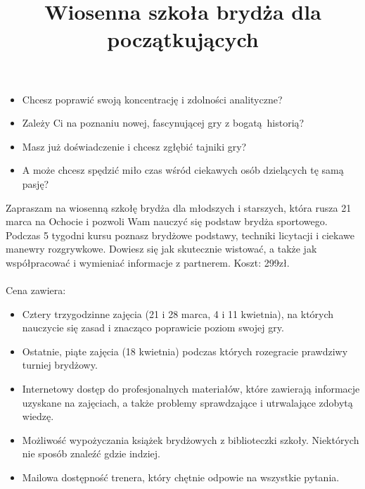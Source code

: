 \documentclass{article}
\title{Wiosenna szkoła brydża dla początkujących}
\date{}
\author{}
\begin{document}
\maketitle
\vspace{-50px}
\begin{itemize}
	\item Chcesz poprawić swoją koncentrację i zdolności analityczne?
	\item Zależy Ci na poznaniu nowej, fascynującej gry z bogatą historią?
	\item Masz już doświadczenie i chcesz zgłębić tajniki gry?
	\item A może chcesz spędzić miło czas wśród ciekawych osób dzielących tę samą pasję?
\end{itemize}
Zapraszam na wiosenną szkołę brydża dla młodszych i starszych, która rusza 21 marca na Ochocie i pozwoli Wam nauczyć się podstaw brydża sportowego.
Podczas 5 tygodni kursu poznasz brydżowe podstawy, techniki licytacji i ciekawe manewry rozgrywkowe. Dowiesz
się jak skutecznie wistować, a także jak współpracować i wymieniać informacje z partnerem.
Koszt: 299zł.\\\\
Cena zawiera:
\begin{itemize}
	\item Cztery trzygodzinne zajęcia (21 i 28 marca, 4 i 11 kwietnia), na których nauczycie się zasad i znacząco poprawicie poziom swojej gry.
	\item Ostatnie, piąte zajęcia (18 kwietnia) podczas których rozegracie prawdziwy turniej brydżowy.
	\item Internetowy dostęp do profesjonalnych materiałów, które zawierają informacje uzyskane na zajęciach, a także
		problemy sprawdzające i utrwalające zdobytą wiedzę.
	\item Możliwość wypożyczania książek brydżowych z biblioteczki szkoły. Niektórych nie sposób znaleźć gdzie indziej.
	\item Mailowa dostępność trenera, który chętnie odpowie na wszystkie pytania.
\end{itemize}
\end{document}
